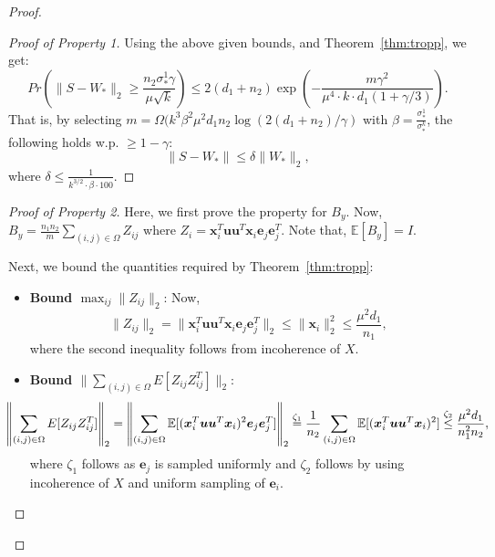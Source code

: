 \documentclass[11pt]{article}
\newcommand{\e}{\bm{e}}
\newcommand{\tp}[1]{{#1}^{T}}
\newcommand{\E}{\mathbb{E}}
\renewcommand{\u}{\bm{u}}
\newcommand{\so}{\sigma_*}
\newcommand{\Wo}{W_*}
\newcommand{\x}{\bm{x}}
\newcommand{\xit}{\tp{\x}_i}
\newcommand{\etj}{\tp{\e}_j}
\newcommand{\ej}{\e_j}
\begin{document}
\begin{proof}
\begin{proof}[Proof of Property 1]
\noindent Using the above given bounds, and Theorem~\ref{thm:tropp}, we get: 
\begin{equation}
  \label{eq:multprz}
  Pr(\|S-\Wo\|_2\geq \frac{n_2\so^1\gamma}{\mu\sqrt{k}})\leq 2(d_1+n_2)\exp\left(-\frac{m\gamma^2}{\mu^4\cdot k\cdot d_1(1+\gamma/3)}\right). 
\end{equation}
That is, by selecting $m=\Omega(k^3 \beta^2 \mu^2 d_1n_2\log(2(d_1+n_2)/\gamma)$ with $\beta=\frac{\so^1}{\so^k}$, the following holds w.p. $\geq 1-\gamma$: 
$$\|S-\Wo\|\leq \delta\|\Wo\|_2,$$ 
where $\delta\leq \frac{1}{k^{3/2}\cdot \beta \cdot 100} $. 
\end{proof}
\begin{proof}[Proof of Property 2]
Here, we first prove the property for $B_y$. Now, $B_y=\frac{n_1n_2}{m}\sum_{(i,j)\in \Omega} Z_{ij}$ where $Z_i=\xit\u\u^T\x_i\ej\etj$. Note that, $\E[B_y]=I$. 

Next, we bound the quantities required by Theorem~\ref{thm:tropp}: 
\begin{itemize}
\item {\bf Bound $\max_{ij} \|Z_{ij}\|_2$}: Now, $$\|Z_{ij}\|_2=\|\xit\u\u^T\x_i \e_j\etj\|_2\leq \|\x_i\|_2^2 \leq \frac{\mu^2d_1}{n_1},$$
where the second inequality follows from incoherence of $X$. 
\item {\bf Bound $\|\sum_{(i,j)\in \Omega}E[Z_{ij}Z_{ij}^T]\|_2$}: %
\begin{align*}
\hspace*{-20pt}\left\|\sum_{(i,j)\in \Omega}E[Z_{ij}Z_{ij}^T]\right\|_2=\left\|\sum_{(i,j)\in \Omega}\E[(\xit\u\u^T\x_i)^2 \e_j\etj]\right\|_2\stackrel{\zeta_1}{=}\frac{1}{n_2}\sum_{(i,j)\in \Omega}\E[(\xit\u\u^T\x_i)^2]\stackrel{\zeta_2}{\leq} \frac{\mu^2 d_1}{n_1^2n_2},
\end{align*}
where $\zeta_1$ follows as $\e_j$ is sampled uniformly and $\zeta_2$ follows by using incoherence of $X$ and uniform sampling of $\e_i$. 


\end{itemize}
\end{proof}
\end{proof}
\end{document}
